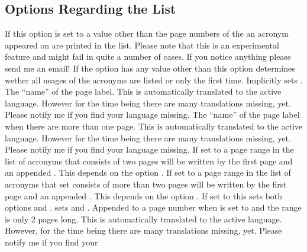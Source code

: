 \documentclass{acro-manual}
\begin{document}
\subsection{Options Regarding the List}
\begin{options}
    If this option is set to a value other than  the page numbers
    of the an acronym appeared on are printed in the list.  Please note that
    this is an experimental feature and might fail in quite a number of cases.
    If you notice anything please send me an email!
    If the option  has any value other than 
    this option determines wether all usages of the acronyms are listed or
    only the first time.  Implicitly sets .
    The ``name'' of the page label.  This is automatically translated to the
    active language. However for the time being there are many translations
    missing, yet.  Please notify me if you find your language missing.
    The ``name'' of the page label when there are more than one page.  This is
    automatically translated to the active language.  However for the time
    being there are many translations missing, yet.  Please notify me if you
    find your language missing. 
    If set to  a page range in the list of acronyms that consists
    of two pages will be written by the first page and an appended
    . This depends on the option . 
    If set to  a page range in the list of acronyms that set
    consists of more than two pages will be written by the first page and an
    appended . This depends on the option .
    If set to  this sets both options
     and .
     sets  and
    .
    Appended to a page number when  is set to
     and the range is only 2 pages long.  This is automatically
    translated to the active language.  However, for the time being there are
    many translations missing, yet.  Please notify me if you find your

\end{options}
\end{document}
